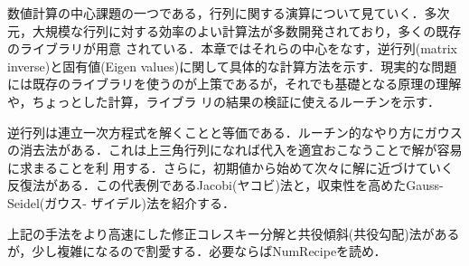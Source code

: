 数値計算の中心課題の一つである，行列に関する演算について見ていく．多次元，大規模な行列に対する効率のよい計算法が多数開発されており，多くの既存のライブラリが用意
されている．本章ではそれらの中心をなす，逆行列(matrix inverse)と固有値(Eigen
values)に関して具体的な計算方法を示す．現実的な問題には既存のライブラリを使うのが上策であるが，それでも基礎となる原理の理解や，ちょっとした計算，ライブラ
リの結果の検証に使えるルーチンを示す．

逆行列は連立一次方程式を解くことと等価である．ルーチン的なやり方にガウスの消去法がある．これは上三角行列になれば代入を適宜おこなうことで解が容易に求まることを利
用する．さらに，初期値から始めて次々に解に近づけていく反復法がある．この代表例であるJacobi(ヤコビ)法と，収束性を高めたGauss-Seidel(ガウス-
ザイデル)法を紹介する．

上記の手法をより高速にした修正コレスキー分解と共役傾斜(共役勾配)法があるが，少し複雑になるので割愛する．必要ならばNumRecipeを読め．